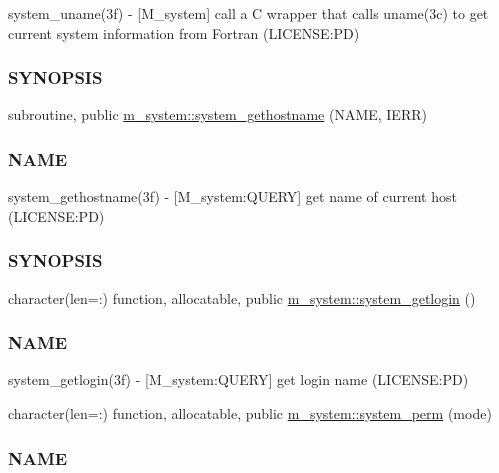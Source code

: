 \begin{DoxyCompactItemize}
\begin{DoxyCompactList}
system\+\_\+uname(3f) -\/ \mbox{[}M\+\_\+system\mbox{]} call a C wrapper that calls uname(3c) to get current system information from Fortran (L\+I\+C\+E\+N\+SE\+:PD) \subsubsection*{S\+Y\+N\+O\+P\+S\+IS}\end{DoxyCompactList}\item 
subroutine, public \mbox{\hyperlink{namespacem__system_a96fab225737afb77ff1cbba9866f0d05}{m\+\_\+system\+::system\+\_\+gethostname}} (N\+A\+ME, I\+E\+RR)
\begin{DoxyCompactList}\small\item\em \subsubsection*{N\+A\+ME}

system\+\_\+gethostname(3f) -\/ \mbox{[}M\+\_\+system\+:Q\+U\+E\+RY\mbox{]} get name of current host (L\+I\+C\+E\+N\+SE\+:PD) \subsubsection*{S\+Y\+N\+O\+P\+S\+IS}\end{DoxyCompactList}\item 
character(len=\+:) function, allocatable, public \mbox{\hyperlink{namespacem__system_a70f78645a1f130734005e190d469529d}{m\+\_\+system\+::system\+\_\+getlogin}} ()
\begin{DoxyCompactList}\small\item\em \subsubsection*{N\+A\+ME}

system\+\_\+getlogin(3f) -\/ \mbox{[}M\+\_\+system\+:Q\+U\+E\+RY\mbox{]} get login name (L\+I\+C\+E\+N\+SE\+:PD) \end{DoxyCompactList}\item 
character(len=\+:) function, allocatable, public \mbox{\hyperlink{namespacem__system_ae8f39e1d4e420396319105e4e81f92b5}{m\+\_\+system\+::system\+\_\+perm}} (mode)
\begin{DoxyCompactList}\small\item\em \subsubsection*{N\+A\+ME}


\end{DoxyCompactList}
\end{DoxyCompactItemize}
